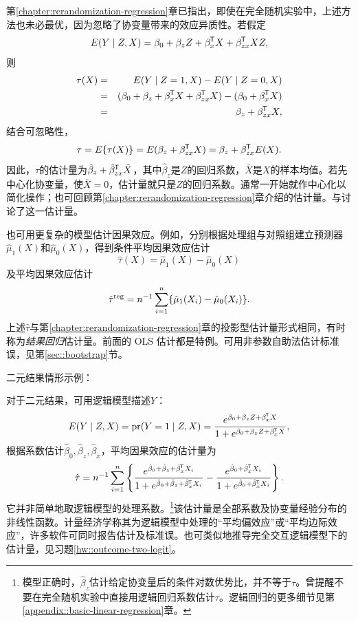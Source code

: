 第\ref{chapter:rerandomization-regression}章已指出，即使在完全随机实验中，上述方法也未必最优，因为忽略了协变量带来的效应异质性。若假定
$$
E(Y\mid Z, X) = \beta_0 + \beta_z Z  + \beta_x^{\mkern-1.5mu\mathsf{T}}  X  + \beta_{zx}^{\mkern-1.5mu\mathsf{T}}  X Z,
$$
则
\begin{eqnarray*}
\tau(X) &=& 
E(Y\mid Z=1, X) - E(Y\mid Z=0, X)  \\
&=& (\beta_0 + \beta_z   + \beta_x^{\mkern-1.5mu\mathsf{T}}  X +\beta_{zx}^{\mkern-1.5mu\mathsf{T}}  X ) - ( \beta_0    + \beta_x^{\mkern-1.5mu\mathsf{T}}  X ) \\
&=& \beta_z+  \beta_{zx}^{\mkern-1.5mu\mathsf{T}}  X,
\end{eqnarray*}
结合可忽略性，
$$
\tau = E\{ \tau(X)  \} =E(\beta_z+  \beta_{zx}^{\mkern-1.5mu\mathsf{T}}  X) = \beta_z + \beta_{zx}^{\mkern-1.5mu\mathsf{T}} E(X). 
$$
因此，$\tau$的估计量为$ \hat{\beta}_z + \hat{\beta}_{zx}^{\mkern-1.5mu\mathsf{T}}  \bar{X}$，其中$\hat{\beta}_z$是$Z$的回归系数，$\bar{X}$是$X$的样本均值。若先中心化协变量，使$\bar{X}=0$，估计量就只是$Z$的回归系数。通常一开始就作中心化以简化操作；也可回顾第\ref{chapter:rerandomization-regression}章介绍的\citet{lin2013}估计量。\citet{rosenbaum1983central}与\citet{hirano2001estimation}讨论了这一估计量。 



也可用更复杂的模型估计因果效应。例如，分别根据处理组与对照组建立预测器$\hat{\mu}_1(X)$和$\hat{\mu}_0(X)$，得到条件平均因果效应估计
$$
\hat\tau(X) = \hat{\mu}_1(X) - \hat{\mu}_0(X)
$$
及平均因果效应估计
$$
\hat{\tau}^{\text{reg}} = n^{-1} \sum_{i=1}^n \{ \hat{\mu}_1(X_i) - \hat{\mu}_0(X_i) \}  . 
$$
上述$\hat{\tau} $与第\ref{chapter:rerandomization-regression}章的投影型估计量形式相同，有时称为{\it 结果回归}估计量。前面的 OLS 估计都是特例。可用非参数自助法估计标准误，见第\ref{sec::bootstrap}节。 


二元结果情形示例： 

 \begin{example}
 [二元结果的结果回归估计]\label{eg::reg-binary}
 对于二元结果，可用逻辑模型描述$Y$：
$$
E(Y\mid Z, X) = \textup{pr}(Y =1\mid Z, X) = \frac{   e^{\beta_0 + \beta_z Z + \beta_x ^{\mkern-1.5mu\mathsf{T}} X}  }
{ 1+ e^{\beta_0 + \beta_z Z + \beta_x ^{\mkern-1.5mu\mathsf{T}} X} } ,
$$
根据系数估计$ \hat \beta_0, \hat \beta_z, \hat{\beta}_x $，平均因果效应的估计量为
$$
\hat{\tau} = n^{-1} \sum_{i=1}^n \left\{  
\frac{   e^{\hat\beta_0 +\hat \beta_z + \hat\beta_x ^{\mkern-1.5mu\mathsf{T}} X_i}  }
{ 1+ e^{\hat\beta_0 +\hat \beta_z  + \hat\beta_x ^{\mkern-1.5mu\mathsf{T}} X_i} }  
- \frac{   e^{\hat\beta_0 + \hat\beta_x ^{\mkern-1.5mu\mathsf{T}} X_i}  }
{ 1+ e^{\hat\beta_0   + \hat\beta_x ^{\mkern-1.5mu\mathsf{T}} X_i} } 
\right \}  . 
$$
它并非简单地取逻辑模型的处理系数。\footnote{模型正确时，$\hat\beta_z$估计给定协变量后的条件对数优势比，并不等于$\tau$。\citet{freedman2008randomization}曾提醒不要在完全随机实验中直接用逻辑回归系数估计$\tau$。逻辑回归的更多细节见第\ref{appendix::basic-linear-regression}章。}该估计量是全部系数及协变量经验分布的非线性函数。计量经济学称其为逻辑模型中处理的“平均偏效应”或“平均边际效应”，许多软件可同时报告估计及标准误。也可类似地推导完全交互逻辑模型下的估计量，见习题\ref{hw::outcome-two-logit}。 
 \end{example}





